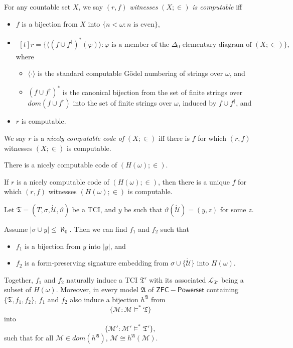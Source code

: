 \documentclass[12pt]{article}
\numberwithin{equation}{section}
\begin{document}
\begin{defi}
For any countable set $X$, we say $(r, f)$ \emph{witnesses} $(X; \in)$ \emph{is computable} iff
\begin{itemize} 
    \item $f$ is a bijection from $X$ into $\{n < \omega : n \text{ is even}\}$,
    \item
    \!
    $\begin{aligned}[t]
        r = \{\langle (f \cup f^{\dagger})^*(\varphi) \rangle : \varphi \text{ is a member of the } \Delta_0 \text{-elementary diagram of } (X; \in)\}, 
    \end{aligned}$
    \medskip
    \\
    where 
    \begin{itemize}[label=$\circ$]
        \item $\langle \cdot \rangle$ is the standard computable G\"odel numbering of strings over $\omega$, and
        \item $(f \cup f^{\dagger})^*$ is the canonical bijection from the set of finite strings over $dom(f \cup f^{\dagger})$ into the set of finite strings over $\omega$, induced by $f \cup f^{\dagger}$, and
    \end{itemize}
    \item $r$ is computable.
\end{itemize}
We say $r$ is a \emph{nicely computable code of} $(X; \in)$ iff there is $f$ for which $(r, f)$ witnesses $(X; \in)$ is computable.
\end{defi}

\begin{fact}
There is a nicely computable code of $(H(\omega); \in)$. 
\end{fact}

\begin{fact}\label{uniquecode}
If $r$ is a nicely computable code of $(H(\omega); \in)$, then there is a unique $f$ for which $(r, f)$ witnesses $(H(\omega); \in)$ is computable.
\end{fact}

Let $\mathfrak{T} = (T, \sigma, \dot{\mathcal{U}}, \vartheta)$ be a TCI, and $y$ be such that $\vartheta(\dot{\mathcal{U}}) = (y, z)$ for some $z$.

Assume $|\sigma \cup y| \leq \aleph_0$. Then we can find $f_1$ and $f_2$ such that
\begin{itemize}
    \item $f_1$ is a bijection from $y$ into $|y|$, and
    \item $f_2$ is a form-preserving signature embedding from $\sigma \cup \{\dot{\mathcal{U}}\}$ into $H(\omega)$.
\end{itemize}
Together, $f_1$ and $f_2$ naturally induce a TCI $\mathfrak{T}'$ with its associated $\mathcal{L}_{\mathfrak{T}'}$ being a subset of $H(\omega)$. Moreover, in every model $\mathfrak{A}$ of $\mathsf{ZFC - Powerset}$ containing $\{\mathfrak{T}, f_1, f_2\}$, $f_1$ and $f_2$ also induce a bijection $h^{\mathfrak{A}}$ from $$\{\mathcal{M} : \mathcal{M} \models^* \mathfrak{T}\}$$ into $$\{\mathcal{M}' : \mathcal{M}' \models^* \mathfrak{T}'\},$$ such that for all $\mathcal{M} \in dom(h^{\mathfrak{A}})$, $\mathcal{M} \cong h^{\mathfrak{A}}(\mathcal{M})$. 
\end{document}

